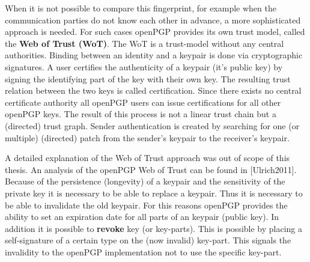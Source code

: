 When it is not possible to compare this fingerprint, for example when the communication parties do not know each other in advance, a more sophisticated approach is needed. For such cases openPGP provides its own trust model, called the \textbf{Web of Trust (WoT)}. The WoT is a trust-model without any central authorities. Binding between an identity and a keypair is done via cryptographic signatures. A user certifies the authenticity of a keypair (it's public key) by signing the identifying part of the key with their own key. The resulting trust relation between the two keys is called certification. Since there exists no central certificate authority all openPGP users can issue certifications for all other openPGP keys. The result of this process is not a linear trust chain but a (directed) trust graph. Sender authentication is created by searching for one (or multiple) (directed) patch from the sender's keypair to the receiver's keypair.

A detailed explanation of the Web of Trust approach was out of scope of this thesis. An analysis of the openPGP Web of Trust can be found in [Ulrich2011]. \\


Because of the persistence (longevity) of a keypair and the sensitivity of the private key it is necessary to be able to replace a keypair. Thus it is necessary to be able to invalidate the old keypair. For this reasons openPGP provides the ability to set an expiration date for all parts of an keypair (public key). In addition it is possible to \textbf{revoke} key (or key-parts). This is possible by placing a self-signature of a certain type on the (now invalid) key-part. This signals the invalidity to the openPGP implementation not to use the specific key-part.
